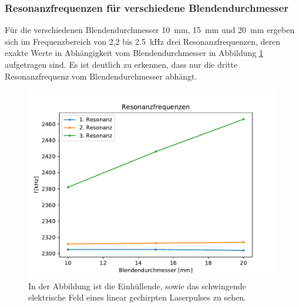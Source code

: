         \subsubsection*{Resonanzfrequenzen für verschiedene Blendendurchmesser}
            Für die verschiedenen Blendendurchmesser \SI{10}{\milli\metre}, \SI{15}{\milli\metre} und \SI{20}{\milli\metre} ergeben sich im Frequenzbereich von 2,2 bis \SI{2.5}{\kilo\hertz} drei 
            Resonanzfrequenzen, deren exakte Werte in Abhängigkeit vom Blendendurchmesser in Abbildung \ref{fig:res_freq_gegen_d_blende} aufgetragen sind. Es ist deutlich zu erkennen, dass nur die dritte
            Resonanzfrequenz vom Blendendurchmesser abhängt. 
            \begin{figure}[ht]
                \centering
                \includegraphics[scale=0.5]{./pictures/res_freq_gegen_d_blende.pdf}
                \caption{In der Abbildung ist die Einhüllende, sowie das schwingende elektrische Feld eines linear gechirpten Laserpulses zu sehen.}
                \label{fig:res_freq_gegen_d_blende}
            \end{figure}
        \FloatBarrier
